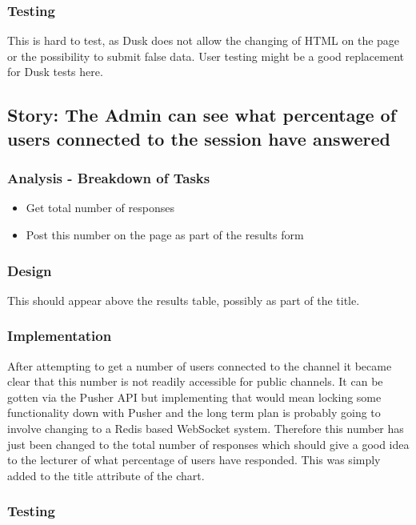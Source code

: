 \subsubsection{Testing}
This is hard to test, as Dusk does not allow the changing of HTML on the page or the possibility to submit false data. User testing might be a good replacement for Dusk tests here.
\newpage

\subsection{Story: The Admin can see what percentage of users connected to the session have answered}
\subsubsection{Analysis - Breakdown of Tasks}
\begin{itemize}
	\item Get total number of responses
	\item Post this number on the page as part of the results form
\end{itemize}
\subsubsection{Design}
This should appear above the results table, possibly as part of the title.
\subsubsection{Implementation}
After attempting to get a number of users connected to the channel it became clear that this number is not readily accessible for public channels. It can be gotten via the Pusher API but implementing that would mean locking some functionality down with Pusher and the long term plan is probably going to involve changing to a Redis based WebSocket system. Therefore this number has just been changed to the total number of responses which should give a good idea to the lecturer of what percentage of users have responded. This was simply added to the title attribute of the chart.
\subsubsection{Testing}
\newpage
